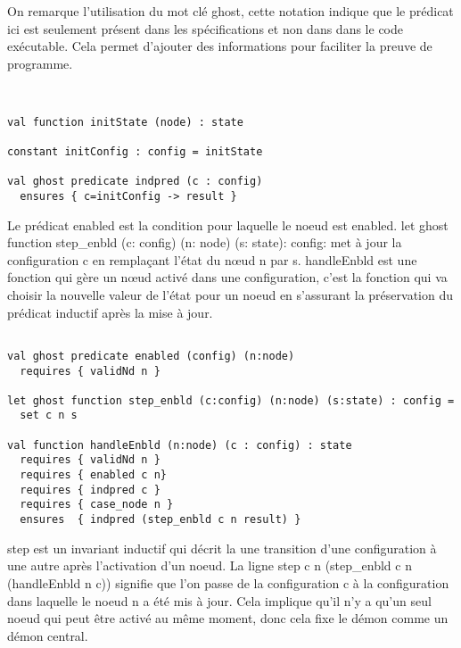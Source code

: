 \documentclass[11pt]{article}
\begin{document}
On remarque l'utilisation du mot clé ghost, cette notation indique que le prédicat ici est seulement présent dans 
les spécifications et non dans dans le code exécutable. Cela permet d'ajouter des informations pour faciliter la
preuve de programme.
\lstset{language=why3,label= ,caption= ,captionpos=b,numbers=none}
\begin{lstlisting}


val function initState (node) : state

constant initConfig : config = initState

val ghost predicate indpred (c : config)
  ensures { c=initConfig -> result }

\end{lstlisting}
Le prédicat enabled est la condition pour laquelle le noeud est enabled.
let ghost function step\_enbld (c: config) (n: node) (s: state): config: met à jour la configuration c en remplaçant l'état du nœud n par s.
handleEnbld est une fonction qui gère un nœud activé dans une configuration, c'est la fonction qui va choisir la nouvelle valeur de l'état pour un noeud
en s'assurant la préservation du prédicat inductif après la mise à jour. 
\lstset{language=why3,label= ,caption= ,captionpos=b,numbers=none}
\begin{lstlisting}

val ghost predicate enabled (config) (n:node)
  requires { validNd n }

let ghost function step_enbld (c:config) (n:node) (s:state) : config =
  set c n s

val function handleEnbld (n:node) (c : config) : state
  requires { validNd n }
  requires { enabled c n}
  requires { indpred c }
  requires { case_node n }
  ensures  { indpred (step_enbld c n result) }

\end{lstlisting}

step est un invariant inductif qui décrit la une transition d'une configuration à une autre après l'activation d'un noeud.
La ligne step c n (step\_enbld c n (handleEnbld n c)) signifie que l'on passe de la configuration c à la configuration dans laquelle le noeud n a été mis à jour. 
Cela implique qu'il n'y a qu'un seul noeud qui peut être activé au même moment, donc cela fixe le démon comme un démon central. 
\end{document}
